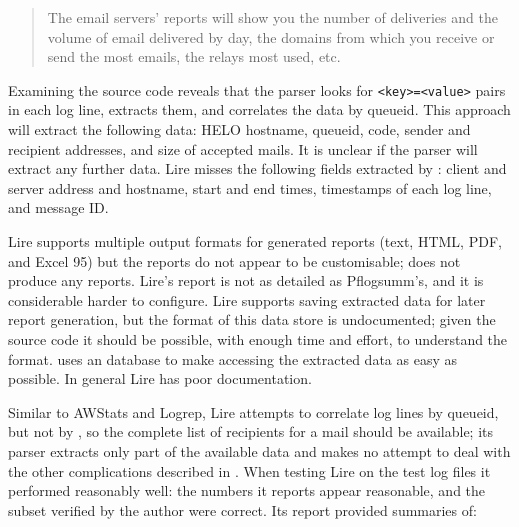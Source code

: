 \begin{quotation}

    \noindent{} The email servers' reports will show you the number of
    deliveries and the volume of email delivered by day, the domains from
    which you receive or send the most emails, the relays most used, etc.

\end{quotation}

\noindent{}Examining the source code reveals that the parser looks for
\texttt{<key>=<value>} pairs in each log line, extracts them, and
correlates the data by queueid.  This approach will extract the following
data: HELO hostname, queueid,  code, sender and recipient
addresses, and size of accepted mails.  It is unclear if the parser will
extract any further data.  Lire misses the following fields extracted by
\parsername{}: client and server  address and hostname, start
and end times, timestamps of each log line, and message ID\@. 

Lire supports multiple output formats for generated reports (text, HTML,
PDF, and Excel 95) but the reports do not appear to be customisable;
\parsername{} does not produce any reports.  Lire's report is not as
detailed as Pflogsumm's, and it is considerable harder to configure.  Lire
supports saving extracted data for later report generation, but the format
of this data store is undocumented; given the source code it should be
possible, with enough time and effort, to understand the format.
\parsername{} uses an  database to make accessing the
extracted data as easy as possible.  In general Lire has poor
documentation.

Similar to AWStats and Logrep, Lire attempts to correlate log lines by
queueid, but not by , so the complete list of recipients for a
mail should be available; its parser extracts only part of the available
data and makes no attempt to deal with the other complications described in
.  When testing Lire on the \numberOFlogFILES{}
test log files it performed reasonably well: the numbers it reports appear
reasonable, and the subset verified by the author were correct.  Its report
provided summaries of: 


